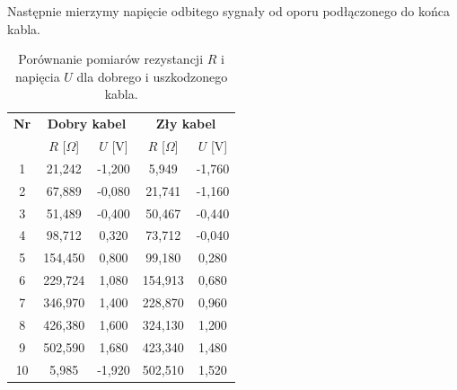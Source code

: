 \documentclass[12pt]{article}
\begin{document}
Następnie mierzymy napięcie odbitego sygnały od oporu podłączonego do końca kabla.

\begin{table}[H]
    \centering
    \begin{tabular}{c|cc|cc}
        \toprule
        \textbf{Nr} & \multicolumn{2}{c|}{\textbf{Dobry kabel}} & \multicolumn{2}{c}{\textbf{Zły kabel}} \\
        & $R$ [$\Omega$] & $U$ [V] & $R$ [$\Omega$] & $U$ [V] \\
        \midrule
        1  & 21{,}242  & -1{,}200 & 5{,}949  & -1{,}760 \\
        2  & 67{,}889  & -0{,}080 & 21{,}741 & -1{,}160 \\
        3  & 51{,}489  & -0{,}400 & 50{,}467 & -0{,}440 \\
        4  & 98{,}712  & 0{,}320  & 73{,}712 & -0{,}040 \\
        5  & 154{,}450 & 0{,}800  & 99{,}180 & 0{,}280 \\
        6  & 229{,}724 & 1{,}080  & 154{,}913 & 0{,}680 \\
        7  & 346{,}970 & 1{,}400  & 228{,}870 & 0{,}960 \\
        8  & 426{,}380 & 1{,}600  & 324{,}130 & 1{,}200 \\
        9  & 502{,}590 & 1{,}680  & 423{,}340 & 1{,}480 \\
        10 & 5{,}985   & -1{,}920 & 502{,}510 & 1{,}520 \\
        \bottomrule
    \end{tabular}
    \caption{Porównanie pomiarów rezystancji $R$ i napięcia $U$ dla dobrego i uszkodzonego kabla.}
    \label{tab:good_vs_bad_cable_voltage}
\end{table}
\end{document}
